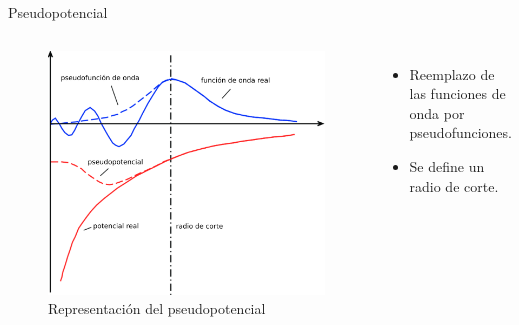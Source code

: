 \begin{frame}{Pseudopotencial}
     \begin{columns}[t]
        \begin{figure}[H]
            \centering
            \includegraphics[width=1.0\textwidth]{contenido/teoria/img_teoria/pseudopotential.png}
            \caption{Representaci\'on del pseudopotencial}
        \end{figure}
        \begin{itemize}
            \item Reemplazo de las funciones de onda por pseudofunciones.
            \item Se define un radio de corte.
        \end{itemize}
    \end{columns}
    
\end{frame}